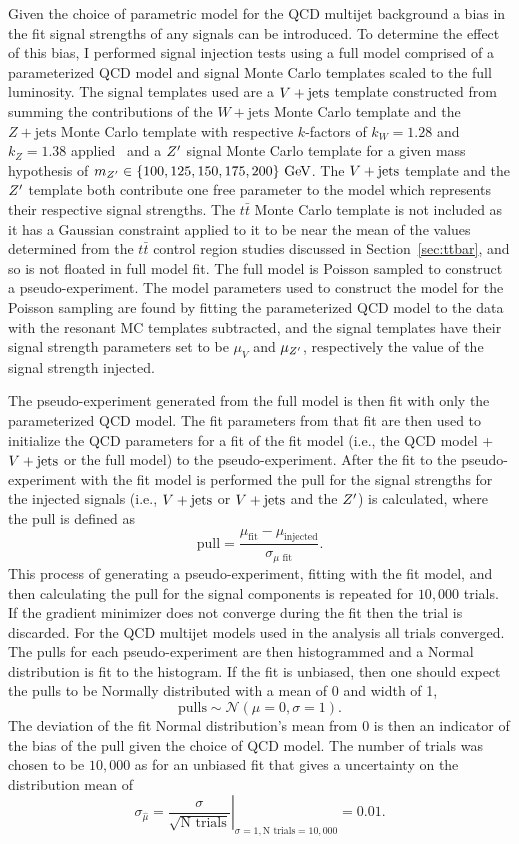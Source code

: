 Given the choice of parametric model for the QCD multijet background a bias in the fit signal strengths of any signals can be introduced.
To determine the effect of this bias, I performed signal injection tests using a full model comprised of a parameterized QCD model and signal Monte Carlo templates scaled to the full luminosity.
The signal templates used are a $V + \text{jets}$ template constructed from summing the contributions of the $W+\mathrm{jets}$ Monte Carlo template and the $Z+\mathrm{jets}$ Monte Carlo template with respective $k$-factors of $k_{W} = 1.28$ and $k_{Z} = 1.38$ applied~\cite{EXOT-2017-01} and a $Z'$ signal Monte Carlo template for a given mass hypothesis of $m_{Z'}\in\{100, 125, 150, 175, 200\}~\mathrm{GeV}$.
The $V + \text{jets}$ template and the $Z'$ template both contribute one free parameter to the model which represents their respective signal strengths.
The $t\bar{t}$ Monte Carlo template is not included as it has a Gaussian constraint applied to it to be near the mean of the values determined from the $t\bar{t}$ control region studies discussed in Section~\ref{sec:ttbar}, and so is not floated in full model fit.
The full model is Poisson sampled to construct a pseudo-experiment.
The model parameters used to construct the model for the Poisson sampling are found by fitting the parameterized QCD model to the data with the resonant MC templates subtracted, and the signal templates have their signal strength parameters set to be $\mu_{V}$ and $\mu_{Z'}$, respectively the value of the signal strength injected.

The pseudo-experiment generated from the full model is then fit with only the parameterized QCD model.
The fit parameters from that fit are then used to initialize the QCD parameters for a fit of the fit model (i.e., the QCD model + $V + \text{jets}$ or the full model) to the pseudo-experiment.
After the fit to the pseudo-experiment with the fit model is performed the pull for the signal strengths for the injected signals (i.e., $V + \text{jets}$ or $V + \text{jets}$ and the $Z'$) is calculated, where the pull is defined as
\begin{equation}
 \mathrm{pull} = \frac{\mu_{\mathrm{fit}} - \mu_{\mathrm{injected}}}{\sigma_{\mu\textrm{ fit}}}.
 \label{eq:pull}
\end{equation}
This process of generating a pseudo-experiment, fitting with the fit model, and then calculating the pull for the signal components is repeated for $10,000$ trials.
If the gradient minimizer does not converge during the fit then the trial is discarded.
For the QCD multijet models used in the analysis all trials converged.
The pulls for each pseudo-experiment are then histogrammed and a Normal distribution is fit to the histogram.
If the fit is unbiased, then one should expect the pulls to be Normally distributed with a mean of 0 and width of 1,
\[
 \textrm{pulls} \sim \mathcal{N}\left(\mu=0, \sigma=1\right).
\]
The deviation of the fit Normal distribution's mean from $0$ is then an indicator of the bias of the pull given the choice of QCD model.
The number of trials was chosen to be $10,000$ as for an unbiased fit that gives a uncertainty on the distribution mean of
\[
 \left.\sigma_{\hat{\mu}} = \frac{\sigma}{\sqrt{\textrm{N trials}}}\right|_{\sigma = 1, \textrm{N trials}=10,000} = 0.01.
\]

